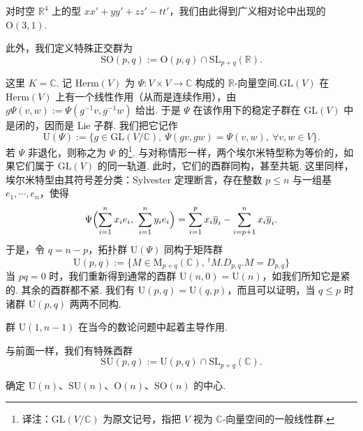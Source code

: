 \begin{example*}
对时空 $\mathbb R^4$ 上的型 $xx'+yy'+zz'-tt'$，我们由此得到广义相对论中出现的  $\mathrm{O}(3,1)$.
\end{example*}
此外，我们定义特殊正交群为
\[
\mathrm{SO}(p,q):=\mathrm{O}(p,q)\cap\mathrm{SL}_{p+q}(\mathbb R).
\]
\begin{numpara}[酉群]\label{np:lie-1-2-3}
这里 $K=\mathbb C$. 记 $\mathrm{Herm}(V)$ 为 $\Psi:V\times V\to\mathbb C$ 构成的 $\mathbb R$-向量空间.$\mathrm{GL}(V)$ 在 $\mathrm{Herm}(V)$ 上有一个线性作用（从而是连续作用），由 $g\Psi(v,w):=\Psi(g^{-1}v,g^{-1}w)$ 给出. 于是 $\Psi$ 在该作用下的稳定子群在 $\mathrm{GL}(V)$ 中是闭的，因而是 Lie 子群. 我们把它记作
\[
\mathrm{U}(\Psi):=\{g\in\mathrm{GL}(V/\mathbb C),\ \Psi(gv,gw)=\Psi(v,w),\ \forall v,w\in V\}.
\]
若 $\Psi$ 非退化，则称之为 $\Psi$ 的\footnote{译注：$\mathrm{GL}(V/\mathbb C)$ 为原文记号，指把 $V$ 视为 $\mathbb C$-向量空间的一般线性群.}.
与对称情形一样，两个埃尔米特型称为等价的，如果它们属于 $\mathrm{GL}(V)$ 的同一轨道. 此时，它们的酉群同构，甚至共轭. 这里同样，埃尔米特型由其符号差分类：Sylvester 定理断言，存在整数 $p\leqslant n$ 与一组基 $e_1,\cdots,e_n$，使得
\[
\Psi\Bigl(\sum_{i=1}^{n}x_ie_i,\ \sum_{i=1}^{n}y_ie_i\Bigr)=\sum_{i=1}^{p}x_i\overline{y}_i-\sum_{i=p+1}^{n}x_i\overline{y}_i.
\]
于是，令 $q=n-p$，拓扑群 $\mathrm{U}(\Psi)$ 同构于矩阵群
\[
\mathrm{U}(p,q):=\{M\in\mathrm{M}_{p+q}(\mathbb C),\ ^t\overline{M}.D_{p,q}.M=D_{p,q}\}
\]
当 $pq=0$ 时，我们重新得到通常的酉群 $\mathrm{U}(n,0)=\mathrm{U}(n)$，如我们所知它是紧的. 其余的酉群都不紧. 我们有 $\mathrm{U}(p,q)=\mathrm{U}(q,p)$，而且可以证明，当 $q\leqslant p$ 时诸群 $\mathrm{U}(p,q)$ 两两不同构.
\end{numpara}
\begin{remark*}
群 $\mathrm{U}(1,n-1)$ 在当今的数论问题中起着主导作用.
\end{remark*}
与前面一样，我们有特殊酉群
\[
\mathrm{SU}(p,q):=\mathrm{U}(p,q)\cap\mathrm{SL}_{p+q}(\mathbb C).
\]
\begin{exercise*}
确定 $\mathrm{U}(n)$、$\mathrm{SU}(n)$、$\mathrm{O}(n)$、$\mathrm{SO}(n)$ 的中心.
\end{exercise*}
